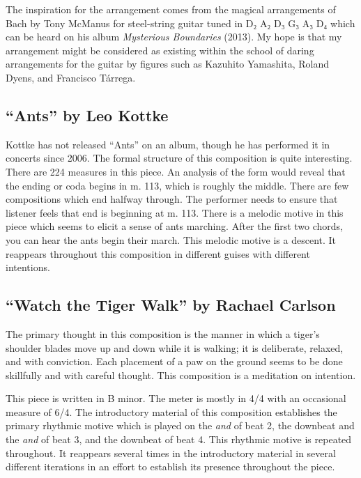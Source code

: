\documentclass{tufte-handout}
\begin{document}
The inspiration for the arrangement comes from the magical arrangements of
Bach by Tony McManus for steel-string guitar tuned in D₂ A₂ D₃ G₃ A₃ D₄ which
can be heard on his album \emph{Mysterious Boundaries} (2013). My hope is that
my arrangement might be considered as existing within the school of daring
arrangements for the guitar by figures such as Kazuhito Yamashita, Roland
Dyens, and Francisco Tárrega.
\subsection*{``Ants'' by Leo Kottke}
\label{sec:ants-leo-kottke}
Kottke has not released ``Ants'' on an album, though he has performed it in
concerts since 2006. The formal structure of this composition is quite
interesting. There are 224 measures in this piece. An analysis of the form
would reveal that the ending or coda begins in m. 113, which is roughly the
middle. There are few compositions which end halfway through. The performer
needs to ensure that listener feels that end is beginning at m. 113. There is
a melodic motive in this piece which seems to elicit a sense of ants
marching. After the first two chords, you can hear the ants begin their
march. This melodic motive is a descent. It reappears throughout this
composition in different guises with different intentions. 
\subsection*{``Watch the Tiger Walk'' by Rachael Carlson}
\label{sec:watch-tiger-walk}
The primary thought in this composition is the manner in which a tiger's shoulder blades move up and down while it is walking; it is deliberate, relaxed, and with conviction. Each placement of a paw on the ground seems to be done skillfully and with careful thought. This composition is a meditation on intention.

This piece is written in B minor. The meter is mostly in 4/4 with an
occasional measure of 6/4. The introductory material of this composition
establishes the primary rhythmic motive which is played on the \emph{and} of
beat 2, the downbeat and the \emph{and} of beat 3, and the downbeat of beat
4. This rhythmic motive is repeated throughout. It reappears
several times in the introductory material in several different iterations in an
effort to establish its presence throughout the piece.

\end{document}
